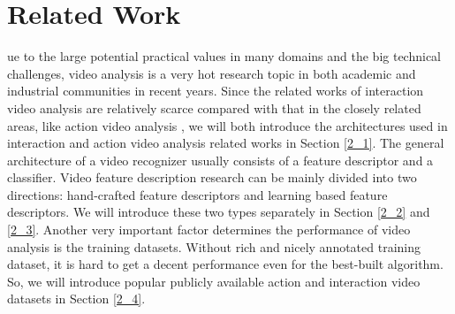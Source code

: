 %
%
\let\textcircled=\pgftextcircled
\chapter{Related Work}
\label{chap2}

ue to the large potential practical values in many domains and the big technical challenges, video analysis is a very hot research topic in both academic and industrial communities in recent years. Since the related works of interaction video analysis \cite{patron2010} \cite{Gemeren2015} \cite{narayan2014} \cite{choi2012} are relatively scarce compared with that in the closely related areas, like action video analysis \cite{Ji2013} \cite{Ng2015} \cite{Tran2015} \cite{alex2008} \cite{grepory2010} \cite{karpathy2014} \cite{simonyan2014}, we will both introduce the architectures used in interaction and action video analysis related works in Section \ref{2_1}. The general architecture of a video recognizer usually consists of a feature descriptor and a classifier. Video feature description research can be mainly divided into two directions: hand-crafted feature descriptors and learning based feature descriptors. We will introduce these two types separately in Section \ref{2_2} and \ref{2_3}. Another very important factor determines the performance of video analysis is the training datasets. Without rich and nicely annotated training dataset, it is hard to get a decent performance even for the best-built algorithm. So, we will introduce popular publicly available action and interaction video datasets in Section \ref{2_4}.

